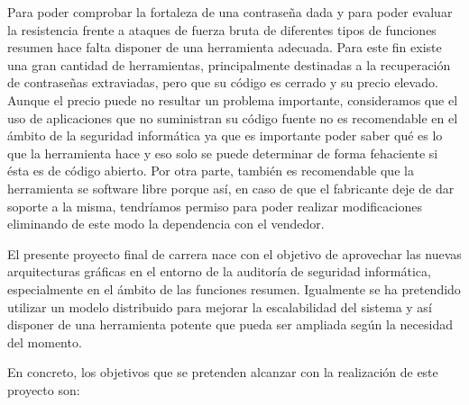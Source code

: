 Para poder comprobar la fortaleza de una contraseña dada y para poder evaluar la resistencia frente a ataques de fuerza bruta de diferentes tipos de funciones resumen hace falta disponer de una herramienta adecuada. Para este fin existe una gran cantidad de herramientas, principalmente destinadas a la recuperación de contraseñas extraviadas, pero que su código es cerrado y su precio elevado. Aunque el precio puede no resultar un problema importante, consideramos que el uso de aplicaciones que no suministran su código fuente no es recomendable en el ámbito de la seguridad informática ya que es importante poder saber qué es lo que la herramienta hace y eso solo se puede determinar de forma fehaciente si ésta es de código abierto. Por otra parte, también es recomendable que la herramienta se software libre porque así, en caso de que el fabricante deje de dar soporte a la misma, tendríamos permiso para poder realizar modificaciones eliminando de este modo la dependencia con el vendedor.

El presente proyecto final de carrera nace con el objetivo de aprovechar las nuevas arquitecturas gráficas en el entorno de la auditoría de seguridad informática, especialmente en el ámbito de las funciones resumen. Igualmente se ha pretendido utilizar un modelo distribuido para mejorar la escalabilidad del sistema y así disponer de una herramienta potente que pueda ser ampliada según la necesidad del momento.

En concreto, los objetivos que se pretenden alcanzar con la realización de este proyecto son:

